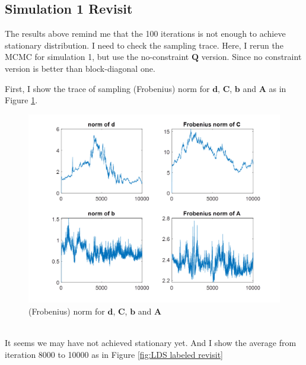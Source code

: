\documentclass[]{article}
\begin{document}
\subsection{Simulation 1 Revisit}
The results above remind me that the 100 iterations is not enough to achieve stationary distribution. I need to check the sampling trace.
Here, I rerun the MCMC for simulation 1, but use the no-constraint \(\mathbf{Q}\) version. Since no constraint version is better than block-diagonal one.

First, I show the trace of sampling (Frobenius) norm for \(\mathbf{d}\), \(\mathbf{C}\), \(\mathbf{b}\) and \(\mathbf{A}\) as in Figure \ref{norms}.
\begin{figure}[h!]
	\centering
	\includegraphics[width = .8\textwidth]{image030.png}
	\caption{(Frobenius) norm for \(\mathbf{d}\), \(\mathbf{C}\), \(\mathbf{b}\) and \(\mathbf{A}\)}
	\label{norms}
\end{figure}\\

It seems we may have not achieved stationary yet. And I show the average from iteration 8000 to 10000 as in Figure \ref{fig:LDS labeled revisit}
\end{document}
